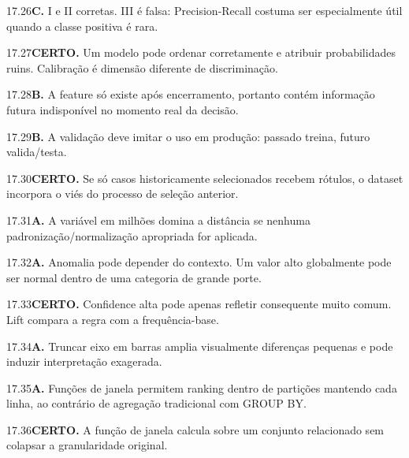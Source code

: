 \begin{solucao}{17.26}\textbf{C.} I e II corretas. III é falsa: Precision-Recall costuma ser especialmente útil quando a classe positiva é rara.\end{solucao}
\begin{solucao}{17.27}\textbf{CERTO.} Um modelo pode ordenar corretamente e atribuir probabilidades ruins. Calibração é dimensão diferente de discriminação.\end{solucao}
\begin{solucao}{17.28}\textbf{B.} A feature só existe após encerramento, portanto contém informação futura indisponível no momento real da decisão.\end{solucao}
\begin{solucao}{17.29}\textbf{B.} A validação deve imitar o uso em produção: passado treina, futuro valida/testa.\end{solucao}
\begin{solucao}{17.30}\textbf{CERTO.} Se só casos historicamente selecionados recebem rótulos, o dataset incorpora o viés do processo de seleção anterior.\end{solucao}
\begin{solucao}{17.31}\textbf{A.} A variável em milhões domina a distância se nenhuma padronização/normalização apropriada for aplicada.\end{solucao}
\begin{solucao}{17.32}\textbf{A.} Anomalia pode depender do contexto. Um valor alto globalmente pode ser normal dentro de uma categoria de grande porte.\end{solucao}
\begin{solucao}{17.33}\textbf{CERTO.} Confidence alta pode apenas refletir consequente muito comum. Lift compara a regra com a frequência-base.\end{solucao}
\begin{solucao}{17.34}\textbf{A.} Truncar eixo em barras amplia visualmente diferenças pequenas e pode induzir interpretação exagerada.\end{solucao}
\begin{solucao}{17.35}\textbf{A.} Funções de janela permitem ranking dentro de partições mantendo cada linha, ao contrário de agregação tradicional com GROUP BY.\end{solucao}
\begin{solucao}{17.36}\textbf{CERTO.} A função de janela calcula sobre um conjunto relacionado sem colapsar a granularidade original.\end{solucao}
